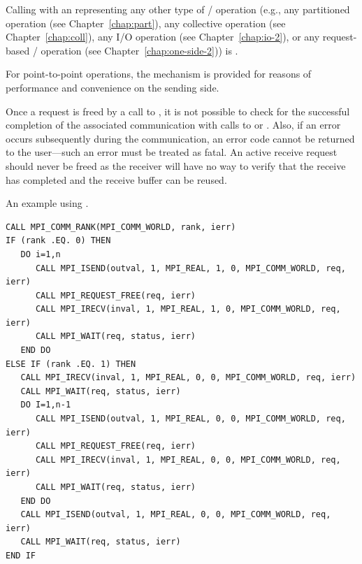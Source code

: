 Calling  with an   representing any
other type of \MPI/ operation (e.g., any partitioned operation (see Chapter~\ref{chap:part}),
any collective operation (see Chapter~\ref{chap:coll}), any I/O
operation (see Chapter~\ref{chap:io-2}), or any
request-based \RMA/ operation (see Chapter~\ref{chap:one-side-2})) is .

\begin{rationale}
For point-to-point operations, the  mechanism is provided for
reasons of performance and convenience on the sending side.
\end{rationale}

\begin{users}
Once a request is freed by a call to , it is not possible
to check for the successful completion of the associated communication
with calls to  or . Also, if an error occurs subsequently
during the communication, an error code cannot be returned to the
user---such an error must be treated as fatal. An active receive request should
never be freed as the receiver will have no way to verify that the receive
has completed and the receive buffer can be reused.
\end{users}

\begin{example}
\label{pt2pt-exK}
%
%
An example using .

\begin{lstlisting}[language={[MPI]Fortran},basicstyle=\lstsmall]
CALL MPI_COMM_RANK(MPI_COMM_WORLD, rank, ierr)
IF (rank .EQ. 0) THEN
   DO i=1,n
      CALL MPI_ISEND(outval, 1, MPI_REAL, 1, 0, MPI_COMM_WORLD, req, ierr)
      CALL MPI_REQUEST_FREE(req, ierr)
      CALL MPI_IRECV(inval, 1, MPI_REAL, 1, 0, MPI_COMM_WORLD, req, ierr)
      CALL MPI_WAIT(req, status, ierr)
   END DO
ELSE IF (rank .EQ. 1) THEN
   CALL MPI_IRECV(inval, 1, MPI_REAL, 0, 0, MPI_COMM_WORLD, req, ierr)
   CALL MPI_WAIT(req, status, ierr)
   DO I=1,n-1
      CALL MPI_ISEND(outval, 1, MPI_REAL, 0, 0, MPI_COMM_WORLD, req, ierr)
      CALL MPI_REQUEST_FREE(req, ierr)
      CALL MPI_IRECV(inval, 1, MPI_REAL, 0, 0, MPI_COMM_WORLD, req, ierr)
      CALL MPI_WAIT(req, status, ierr)
   END DO
   CALL MPI_ISEND(outval, 1, MPI_REAL, 0, 0, MPI_COMM_WORLD, req, ierr)
   CALL MPI_WAIT(req, status, ierr)
END IF
\end{lstlisting}
\end{example}


